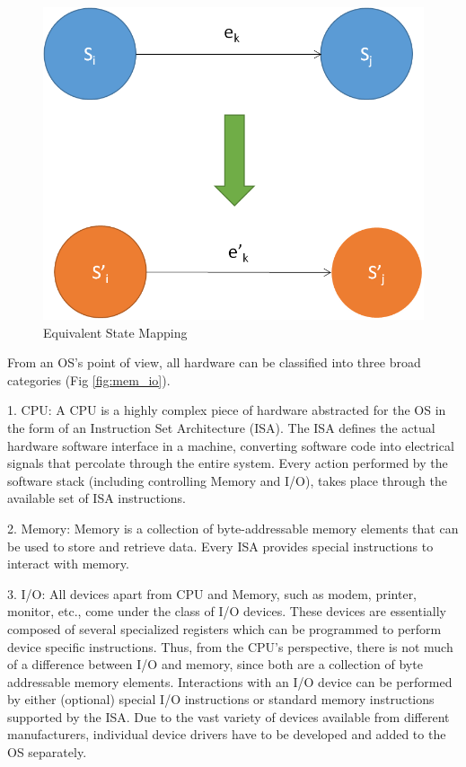 \begin{figure}[H]
  \centering
  \includegraphics[scale=0.8]{figures/vir_phy_map.png}
  \caption[Equivalent State Mapping]{Equivalent State Mapping \cite{smith_nair}}
  \label{fig:statemap}
\end{figure}

From an OS's point of view, all hardware can be classified into three broad categories (Fig \ref{fig:mem_io}).

1. CPU: A CPU is a highly complex piece of hardware abstracted for the OS in the form of an Instruction Set Architecture (ISA). The ISA defines the actual hardware software interface in a machine, converting software code into electrical signals that percolate through the entire system. Every action performed by the software stack (including controlling Memory and I/O), takes place through the available set of ISA instructions.

2. Memory: Memory is a collection of byte-addressable memory elements that can be used to store and retrieve data. Every ISA provides special instructions to interact with memory.

3. I/O: All devices apart from CPU and Memory, such as modem, printer, monitor, etc., come under the class of I/O devices. These devices are essentially composed of several specialized registers which can be programmed to perform device specific instructions. Thus, from the CPU’s perspective, there is not much of a difference between I/O and memory, since both are a collection of byte addressable memory elements. Interactions with an I/O device can be performed by either (optional) special I/O instructions or standard memory instructions supported by the ISA. Due to the vast variety of devices available from different manufacturers, individual device drivers have to be developed and added to the OS separately.

